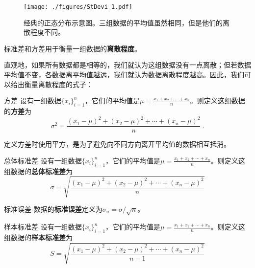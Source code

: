 


\begin{figure}[ht]
\centering
\texttt{[image: ./figures/StDevi\_1.pdf]}
\caption{经典的正态分布示意图。三组数据的平均值虽然相同，但是他们的离散程度不同。} \label{StDevi_fig1}
\end{figure}

标准差和方差用于衡量一组数据的\textbf{离散程度}。

直观地，如果所有数据都是相等的，我们就认为这组数据没有一点离散；但若数据平均值不变，各数据离平均值越远，我们就认为数据离散程度越高。因此，我们可以给出衡量离散程度的式子：

\begin{definition}{方差}\label{StDevi_def1}
设有一组数据$\{x_i\}_{i=1}^n$，它们的平均值是$\mu=\frac{x_1+x_2+\cdots+x_n}{n}$。则定义这组数据的\textbf{方差}为
\begin{equation}\label{StDevi_eq1}
\sigma^2 = \frac{(x_1-\mu)^2+(x_2-\mu)^2+\cdots+(x_n-\mu)^2}{n}~.
\end{equation}
\end{definition}

定义方差时使用平方，是为了避免向不同方向离开平均值的数据相互抵消。

\begin{definition}{总体标准差}
设有一组数据$\{x_i\}_{i=1}^n$，它们的平均值是$\mu=\frac{x_1+x_2+\cdots+x_n}{n}$。则定义这组数据的\textbf{总体标准差}为
\begin{equation}
\sigma = \sqrt{\frac{(x_1-\mu)^2+(x_2-\mu)^2+\cdots+(x_n-\mu)^2}{n}}
\end{equation}
\end{definition}

\begin{definition}{标准误差}
数据的\textbf{标准误差}定义为$\sigma_n=\sigma/\sqrt{n}$。
\end{definition}





\begin{definition}{样本标准差}
设有一组数据$\{x_i\}_{i=1}^n$，它们的平均值是$\mu=\frac{x_1+x_2+\cdots+x_n}{n}$。则定义这组数据的\textbf{样本标准差}为
\begin{equation}
S = \sqrt{\frac{(x_1-\mu)^2+(x_2-\mu)^2+\cdots+(x_n-\mu)^2}{n-1}}
\end{equation}
\end{definition}


